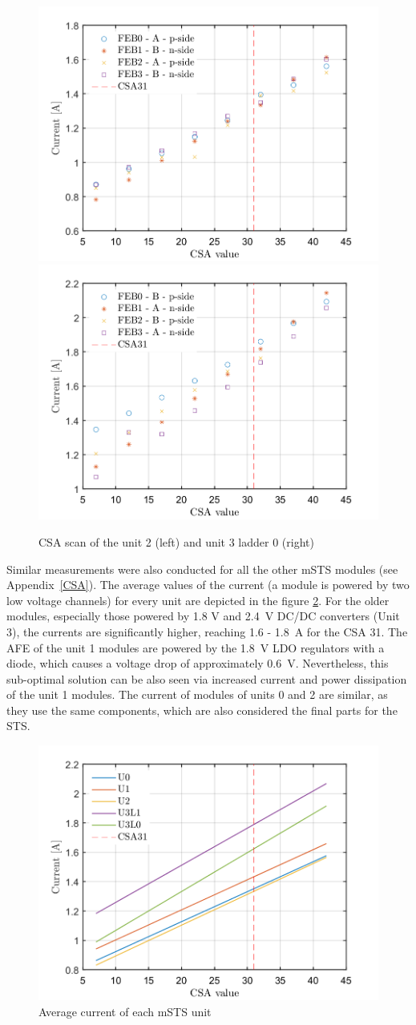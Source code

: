 \begin{figure}[h!]
\centering
\includegraphics[width=0.45\columnwidth]{Chapter6/DCS/images/U2CSABIAS.png}
\includegraphics[width=0.45\columnwidth]{Chapter6/DCS/images/U3L1CSABIAS.png}
\caption{CSA scan of the unit 2 (left) and unit 3 ladder 0 (right)}
\label{fig_power2}
\end{figure}
\newpage
Similar measurements were also conducted for all the other \gls{mSTS} modules (see Appendix~\ref{CSA}). The average values of the current (a module is powered by two low voltage channels) for every unit are depicted in the figure \ref{fig_avg}. For the older modules, especially those powered by 1.8 V and 2.4~V DC/DC converters (Unit 3), the currents are significantly higher, reaching 1.6 - 1.8~A for the \gls{CSA} 31. The \gls{AFE} of the unit 1 modules are powered by the 1.8~V \gls{LDO} regulators with a diode, which causes a voltage drop of approximately 0.6~V. Nevertheless, this sub-optimal solution can be also seen via increased current and power dissipation of the unit 1 modules. The current of modules of units 0 and 2 are similar, as they use the same components, which are also considered the final parts for the \gls{STS}.

\begin{figure}[h!]
\centering
\includegraphics[width=0.6\columnwidth]{Chapter6/DCS/images/units.png}
\caption{Average current of each \gls{mSTS} unit}
\label{fig_avg}
\end{figure}

